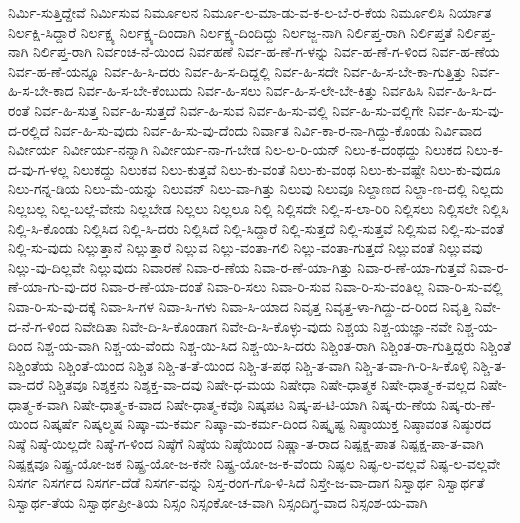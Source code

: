 {ನಿರ್ಮಿ-ಸುತ್ತಿದ್ದೇವೆ
ನಿರ್ಮಿಸುವ
ನಿರ್ಮೂಲನ
ನಿರ್ಮೂ-ಲ-ಮಾ-ಡು-ವ-ಕ-ಲ-ಬೆ-ರ-ಕೆಯ
ನಿರ್ಮೂಲಿಸಿ
ನಿರ್ಯಾತ
ನಿರ್ಲಕ್ಷಿ-ಸಿದ್ದಾರೆ
ನಿರ್ಲಕ್ಷ್ಯ
ನಿರ್ಲಕ್ಷ್ಯ-ದಿಂದಾಗಿ
ನಿರ್ಲಕ್ಷ್ಯ-ದಿಂದಿದ್ದು
ನಿರ್ಲಜ್ಜ-ನಾಗಿ
ನಿರ್ಲಿಪ್ತ-ರಾಗಿ
ನಿರ್ಲಿಪ್ತತೆ
ನಿರ್ಲಿಪ್ತ-ನಾಗಿ
ನಿರ್ಲಿಪ್ತ-ರಾಗಿ
ನಿರ್ವಂಚ-ನೆ-ಯಿಂದ
ನಿರ್ವಹಣೆ
ನಿರ್ವ-ಹ-ಣೆ-ಗ-ಳನ್ನು
ನಿರ್ವ-ಹ-ಣೆ-ಗ-ಳಿಂದ
ನಿರ್ವ-ಹ-ಣೆಯ
ನಿರ್ವ-ಹ-ಣೆ-ಯನ್ನೂ
ನಿರ್ವ-ಹಿ-ಸಿ-ದರು
ನಿರ್ವ-ಹಿ-ಸ-ದಿದ್ದಲ್ಲಿ
ನಿರ್ವ-ಹಿ-ಸದೇ
ನಿರ್ವ-ಹಿ-ಸ-ಬೇ-ಕಾ-ಗುತ್ತಿತ್ತು
ನಿರ್ವ-ಹಿ-ಸ-ಬೇ-ಕಾದ
ನಿರ್ವ-ಹಿ-ಸ-ಬೇ-ಕೆಂಬುದು
ನಿರ್ವ-ಹಿ-ಸಲು
ನಿರ್ವ-ಹಿ-ಸ-ಲೇ-ಬೇ-ಕಿತ್ತು
ನಿರ್ವಹಿಸಿ
ನಿರ್ವ-ಹಿ-ಸಿ-ದ-ರಂತೆ
ನಿರ್ವ-ಹಿ-ಸುತ್ತ
ನಿರ್ವ-ಹಿ-ಸುತ್ತದೆ
ನಿರ್ವ-ಹಿ-ಸುವ
ನಿರ್ವ-ಹಿ-ಸು-ವಲ್ಲಿ
ನಿರ್ವ-ಹಿ-ಸು-ವಲ್ಲಿಗೇ
ನಿರ್ವ-ಹಿ-ಸು-ವು-ದ-ರಲ್ಲಿದೆ
ನಿರ್ವ-ಹಿ-ಸು-ವುದು
ನಿರ್ವ-ಹಿ-ಸು-ವು-ದೆಂದು
ನಿರ್ವಾತ
ನಿರ್ವಿ-ಕಾ-ರ-ನಾ-ಗಿದ್ದು-ಕೊಂಡು
ನಿರ್ವಿವಾದ
ನಿರ್ವೀರ್ಯ
ನಿರ್ವೀರ್ಯ-ನನ್ನಾಗಿ
ನಿರ್ವೀರ್ಯ-ನಾ-ಗ-ಬೇಡ
ನಿಲ-ಲ-ರಿ-ಯನ್
ನಿಲು-ಕ-ದಂಥದ್ದು
ನಿಲುಕದ
ನಿಲು-ಕ-ದ-ವು-ಗ-ಳಲ್ಲ
ನಿಲುಕದ್ದು
ನಿಲುಕವ
ನಿಲು-ಕುತ್ತವೆ
ನಿಲು-ಕು-ವಂತೆ
ನಿಲು-ಕು-ವಂಥ
ನಿಲು-ಕು-ವಷ್ಟೇ
ನಿಲು-ಕು-ವುದೂ
ನಿಲು-ಗನ್ನ-ಡಿಯ
ನಿಲು-ಮೆ-ಯನ್ನು
ನಿಲುವನ್
ನಿಲು-ವಾ-ಗಿತ್ತು
ನಿಲುವು
ನಿಲುವೂ
ನಿಲ್ದಾಣದ
ನಿಲ್ದಾ-ಣ-ದಲ್ಲಿ
ನಿಲ್ಲದು
ನಿಲ್ಲಬಲ್ಲ
ನಿಲ್ಲ-ಬಲ್ಲೆ-ವೇನು
ನಿಲ್ಲಬೇಡ
ನಿಲ್ಲಲು
ನಿಲ್ಲಲೂ
ನಿಲ್ಲಿ
ನಿಲ್ಲಿಸದೇ
ನಿಲ್ಲಿ-ಸ-ಲಾ-ರಿರಿ
ನಿಲ್ಲಿಸಲು
ನಿಲ್ಲಿಸಲೇ
ನಿಲ್ಲಿಸಿ
ನಿಲ್ಲಿ-ಸಿ-ಕೊಂಡು
ನಿಲ್ಲಿಸಿದ
ನಿಲ್ಲಿ-ಸಿ-ದರು
ನಿಲ್ಲಿಸಿದೆ
ನಿಲ್ಲಿ-ಸಿದ್ದಾರೆ
ನಿಲ್ಲಿ-ಸುತ್ತದೆ
ನಿಲ್ಲಿ-ಸುತ್ತವೆ
ನಿಲ್ಲಿಸುವ
ನಿಲ್ಲಿ-ಸು-ವಂತೆ
ನಿಲ್ಲಿ-ಸು-ವುದು
ನಿಲ್ಲುತ್ತಾನೆ
ನಿಲ್ಲುತ್ತಾರೆ
ನಿಲ್ಲುವ
ನಿಲ್ಲು-ವಂತಾ-ಗಲಿ
ನಿಲ್ಲು-ವಂತಾ-ಗುತ್ತದೆ
ನಿಲ್ಲುವಂತೆ
ನಿಲ್ಲುವವು
ನಿಲ್ಲು-ವು-ದಿಲ್ಲವೇ
ನಿಲ್ಲುವುದು
ನಿವಾರಣೆ
ನಿವಾ-ರ-ಣೆಯ
ನಿವಾ-ರ-ಣೆ-ಯಾ-ಗಿತ್ತು
ನಿವಾ-ರ-ಣೆ-ಯಾ-ಗುತ್ತವೆ
ನಿವಾ-ರ-ಣೆ-ಯಾ-ಗು-ವು-ದರ
ನಿವಾ-ರ-ಣೆ-ಯಾ-ದಂತೆ
ನಿವಾ-ರಿ-ಸಲು
ನಿವಾ-ರಿ-ಸುವ
ನಿವಾ-ರಿ-ಸು-ವಂತಿಲ್ಲ
ನಿವಾ-ರಿ-ಸು-ವಲ್ಲಿ
ನಿವಾ-ರಿ-ಸು-ವು-ದಕ್ಕೆ
ನಿವಾ-ಸಿ-ಗಳ
ನಿವಾ-ಸಿ-ಗಳು
ನಿವಾ-ಸಿ-ಯಾದ
ನಿವೃತ್ತ
ನಿವೃತ್ತ-ಳಾ-ಗಿದ್ದು-ದ-ರಿಂದ
ನಿವೃತ್ತಿ
ನಿವೇ-ದ-ನೆ-ಗ-ಳಿಂದ
ನಿವೇದಿತಾ
ನಿವೇ-ದಿ-ಸಿ-ಕೊಂಡಾಗ
ನಿವೇ-ದಿ-ಸಿ-ಕೊಳ್ಳು-ವುದು
ನಿಶ್ಚಯ
ನಿಶ್ಚ-ಯಜ್ಞಾ-ನವೇ
ನಿಶ್ಚ-ಯ-ದಿಂದ
ನಿಶ್ಚ-ಯ-ವಾಗಿ
ನಿಶ್ಚ-ಯ-ವೆಂದು
ನಿಶ್ಚ-ಯಿ-ಸಿದ
ನಿಶ್ಚ-ಯಿ-ಸಿ-ದರು
ನಿಶ್ಚಿಂತ-ರಾಗಿ
ನಿಶ್ಚಿಂತ-ರಾ-ಗುತ್ತಿದ್ದರು
ನಿಶ್ಚಿಂತೆ
ನಿಶ್ಚಿಂತೆಯ
ನಿಶ್ಚಿಂತೆ-ಯಿಂದ
ನಿಶ್ಚಿತ
ನಿಶ್ಚಿ-ತ-ತೆ-ಯಿಂದ
ನಿಶ್ಚಿ-ತ-ಪಥ
ನಿಶ್ಚಿ-ತ-ವಾಗಿ
ನಿಶ್ಚಿ-ತ-ವಾ-ಗಿ-ರಿ-ಸಿ-ಕೊಳ್ಳಿ
ನಿಶ್ಚಿ-ತ-ವಾ-ದರೆ
ನಿಶ್ಚಿತವೂ
ನಿಶ್ಶಕ್ತನು
ನಿಶ್ಶಕ್ತ-ವಾ-ದವು
ನಿಷೇ-ಧ-ಮಯ
ನಿಷೇಧಾ
ನಿಷೇ-ಧಾತ್ಮಕ
ನಿಷೇ-ಧಾತ್ಮ-ಕ-ವಲ್ಲದ
ನಿಷೇ-ಧಾತ್ಮ-ಕ-ವಾಗಿ
ನಿಷೇ-ಧಾತ್ಮ-ಕ-ವಾದ
ನಿಷೇ-ಧಾತ್ಮ-ಕವೊ
ನಿಷ್ಕಪಟ
ನಿಷ್ಕ-ಪ-ಟಿ-ಯಾಗಿ
ನಿಷ್ಕ-ರು-ಣೆಯ
ನಿಷ್ಕ-ರು-ಣೆ-ಯಿಂದ
ನಿಷ್ಕರ್ಷೆ
ನಿಷ್ಕಲ್ಮಷ
ನಿಷ್ಕಾ-ಮ-ಕರ್ಮ
ನಿಷ್ಕಾ-ಮ-ಕರ್ಮ-ದಿಂದ
ನಿಷ್ಕೃಷ್ಟ
ನಿಷ್ಠಾಯುಕ್ತ
ನಿಷ್ಠಾವಂತ
ನಿಷ್ಠುರದ
ನಿಷ್ಠೆ
ನಿಷ್ಠೆ-ಯಿಲ್ಲದೇ
ನಿಷ್ಠೆ-ಗ-ಳಿಂದ
ನಿಷ್ಠೆಗೆ
ನಿಷ್ಠೆಯ
ನಿಷ್ಠೆಯಿಂದ
ನಿಷ್ಣಾ-ತ-ರಾದ
ನಿಷ್ಪಕ್ಷ-ಪಾತ
ನಿಷ್ಪಕ್ಷ-ಪಾ-ತ-ವಾಗಿ
ನಿಷ್ಪಕ್ಷವೂ
ನಿಷ್ಪ್ರ-ಯೋ-ಜಕ
ನಿಷ್ಪ್ರ-ಯೋ-ಜ-ಕನೇ
ನಿಷ್ಪ್ರ-ಯೋ-ಜ-ಕ-ವೆಂದು
ನಿಷ್ಫಲ
ನಿಷ್ಫ-ಲ-ವಲ್ಲವೆ
ನಿಷ್ಫ-ಲ-ವಲ್ಲವೇ
ನಿಸರ್ಗ
ನಿಸರ್ಗದ
ನಿಸರ್ಗ-ದೆಡೆ
ನಿಸರ್ಗ-ವನ್ನು
ನಿಸ್ತ-ರಂಗ-ಗೊ-ಳಿ-ಸಿದೆ
ನಿಸ್ತೇ-ಜ-ವಾ-ದಾಗ
ನಿಸ್ವಾರ್ಥ
ನಿಸ್ವಾರ್ಥತೆ
ನಿಸ್ವಾರ್ಥ-ತೆಯ
ನಿಸ್ವಾರ್ಥಪ್ರೀ-ತಿಯ
ನಿಸ್ಸಂ
ನಿಸ್ಸಂಕೋ-ಚ-ವಾಗಿ
ನಿಸ್ಸಂದಿಗ್ಧ-ವಾದ
ನಿಸ್ಸಂಶ-ಯ-ವಾಗಿ
}

